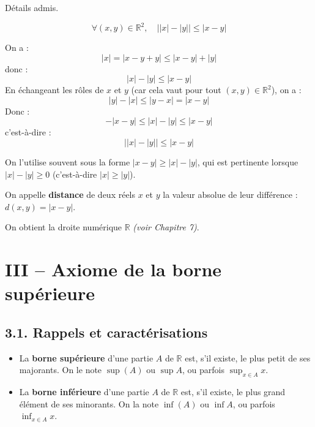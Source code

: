 \documentclass[a4paper,11pt]{article}
\newcommand{\R}{\mathbb{R}}
\newcommand{\mot}[1]{\textcolor{bordeaux}{\textbf{#1}}}
\begin{document}
\begin{demonstration}
Détails admis.
\end{demonstration}

\begin{corollaire}
\[
\forall (x, y) \in \R^2, \quad \big| |x| - |y| \big| \le |x - y|
\]
\end{corollaire}

\begin{demonstration}
On a :
\[
|x| = |x - y + y| \le |x - y| + |y|
\]
donc :
\[
|x| - |y| \le |x - y|
\]
En échangeant les rôles de $x$ et $y$ (car cela vaut pour tout $(x, y) \in \R^2$), on a :
\[
|y| - |x| \le |y - x| = |x - y|
\]
Donc :
\[
-|x - y| \le |x| - |y| \le |x - y|
\]
c'est-à-dire :
\[
\big| |x| - |y| \big| \le |x - y|
\]
\end{demonstration}

\begin{remarque}
On l'utilise souvent sous la forme $|x - y| \ge |x| - |y|$, qui est pertinente lorsque $|x| - |y| \ge 0$ (c'est-à-dire $|x| \ge |y|$).
\end{remarque}

\begin{definition}[Distance usuelle sur $\R$]
On appelle \mot{distance} de deux réels $x$ et $y$ la valeur absolue de leur différence : $d(x, y) = |x - y|$.
\end{definition}

On obtient la droite numérique $\R$ \textit{(voir Chapitre 7)}.

\newpage
\section{III -- Axiome de la borne supérieure}

\subsection{3.1. Rappels et caractérisations}

\begin{definition}
\begin{itemize}
    \item La \mot{borne supérieure} d'une partie $A$ de $\R$ est, s'il existe, le plus petit de ses majorants. On le note $\sup(A)$ ou $\sup A$, ou parfois $\displaystyle\sup_{x \in A} x$.
    \item La \mot{borne inférieure} d'une partie $A$ de $\R$ est, s'il existe, le plus grand élément de ses minorants. On la note $\inf(A)$ ou $\inf A$, ou parfois $\displaystyle\inf_{x \in A} x$.
\end{itemize}
\end{definition}
\end{document}
